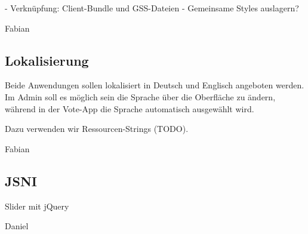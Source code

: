 - Verknüpfung: Client-Bundle und GSS-Dateien
- Gemeinsame Styles auslagern?

Fabian

\subsection{Lokalisierung}
Beide Anwendungen sollen lokalisiert in Deutsch und Englisch angeboten werden.
Im Admin soll es möglich sein die Sprache über die Oberfläche zu ändern, während
in der Vote-App die Sprache automatisch ausgewählt wird.

Dazu verwenden wir Ressourcen-Strings (TODO).

Fabian

\subsection{JSNI}
Slider mit jQuery

Daniel